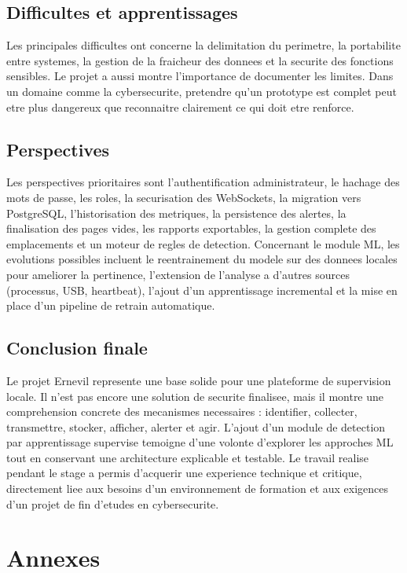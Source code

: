 \documentclass[12pt,a4paper]{report}
\begin{document}
\section{Difficultes et apprentissages}
Les principales difficultes ont concerne la delimitation du perimetre, la portabilite entre systemes, la gestion de la fraicheur des donnees et la securite des fonctions sensibles. Le projet a aussi montre l'importance de documenter les limites. Dans un domaine comme la cybersecurite, pretendre qu'un prototype est complet peut etre plus dangereux que reconnaitre clairement ce qui doit etre renforce.

\section{Perspectives}
Les perspectives prioritaires sont l'authentification administrateur, le hachage des mots de passe, les roles, la securisation des WebSockets, la migration vers PostgreSQL, l'historisation des metriques, la persistence des alertes, la finalisation des pages vides, les rapports exportables, la gestion complete des emplacements et un moteur de regles de detection. Concernant le module ML, les evolutions possibles incluent le reentrainement du modele sur des donnees locales pour ameliorer la pertinence, l'extension de l'analyse a d'autres sources (processus, USB, heartbeat), l'ajout d'un apprentissage incremental et la mise en place d'un pipeline de retrain automatique.

\section{Conclusion finale}
Le projet Ernevil represente une base solide pour une plateforme de supervision locale. Il n'est pas encore une solution de securite finalisee, mais il montre une comprehension concrete des mecanismes necessaires : identifier, collecter, transmettre, stocker, afficher, alerter et agir. L'ajout d'un module de detection par apprentissage supervise temoigne d'une volonte d'explorer les approches ML tout en conservant une architecture explicable et testable. Le travail realise pendant le stage a permis d'acquerir une experience technique et critique, directement liee aux besoins d'un environnement de formation et aux exigences d'un projet de fin d'etudes en cybersecurite.

\appendix
\chapter{Annexes}
\end{document}
